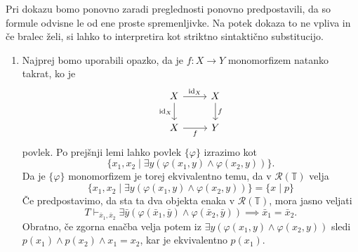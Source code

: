 \documentclass[../kategoricna_logika.tex]{subfiles}
\begin{document}
\begin{dokaz}
  Pri dokazu bomo ponovno zaradi preglednosti ponovno predpostavili,
  da so formule odvisne le od ene proste spremenljivke. Na potek dokaza to ne vpliva
  in če bralec želi, si lahko to interpretira kot striktno sintaktično substitucijo.
  \begin{enumerate}[label=(\roman*)]
  \item Najprej bomo uporabili opazko, da je $f : X \to Y$ monomorfizem natanko takrat,
    ko je
    \begin{equation*}
      \begin{tikzcd}
        X \ar[d, " \mathrm{id}_X"'] \ar[r, " \mathrm{id}_X"] & X \ar[d, "f"] \\
        X \ar[r, "f"'] & Y
      \end{tikzcd}
    \end{equation*}
    povlek. Po prejšnji lemi lahko povlek $\{\varphi\}$ izrazimo kot
    \[ \{ x_1,x_2 \mid \exists y(\varphi(x_1,y) \land \varphi(x_2,y)) \}.\]
    Da je $\{\varphi\}$ monomorfizem je torej ekvivalentno temu,
    da v $\mathcal{R}(\mathbb{T})$ velja
    \[ \{ x_1,x_2 \mid \exists y(\varphi(x_1,y) \land \varphi(x_2,y)) \} = \{x \mid p\} \]
    Če predpostavimo, da sta ta dva objekta enaka v $\mathcal{R}(\mathbb{T})$,
    mora jasno veljati
    $$T \vdash_{\bar{x}_1,\bar{x}_2}  \exists \bar{y} \left( \varphi(\bar{x}_1,\bar{y}) \wedge \varphi(\bar{x}_2,\bar{y}) \right) \implies \bar{x}_1 = \bar{x}_2 .$$
    Obratno, če zgorna enačba velja potem iz $\exists y(\varphi(x_1,y) \land \varphi(x_2,y))$
    sledi $p(x_1) \land p(x_2) \land x_1 = x_2$, kar je ekvivalentno $p(x_1)$.


\end{enumerate}
\end{dokaz}
\end{document}

